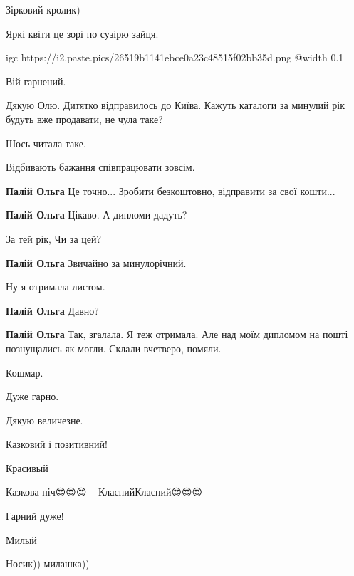 
Зірковий кролик)

\begin{itemize} %

Яркі квіти це зорі по сузірю зайця.
\end{itemize} %


\ifcmt
  igc https://i2.paste.pics/26519b1141ebce0a23c48515f02bb35d.png
	@width 0.1
\fi


Вій гарнений.

\begin{itemize} %

Дякую Олю. Дитятко відправилось до Київа. Кажуть каталоги за минулий рік будуть
вже продавати, не чула таке?


Шось читала таке.


Відбивають бажання співпрацювати зовсім.

\textbf{Палій Ольга} Це точно... Зробити безкоштовно, відправити за свої кошти...

\textbf{Палій Ольга} Цікаво. А дипломи дадуть?


За тей рік, Чи за цей?

\textbf{Палій Ольга} Звичайно за минулорічний.


Ну я отримала листом.

\textbf{Палій Ольга} Давно?

\textbf{Палій Ольга} Так, згалала. Я теж отримала. Але над моїм дипломом на пошті познущались як могли. Склали вчетверо, помяли.

Кошмар.

\end{itemize} %


Дуже гарно.

\begin{itemize} %

Дякую величезне.
\end{itemize} %


Казковий і позитивний!


Красивый


Казкова ніч😍😍😍🌌🌌🌌 КласнийКласний😍😍😍


Гарний дуже!


Милый


Носик)) милашка))
